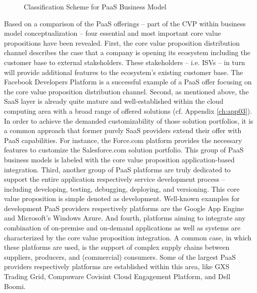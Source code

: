 \begin{figure}[tb]
	\centering
	
	\caption{Classification Scheme for PaaS Business Model}
	\label{fig:cs}
\end{figure}

Based on a comparison of the \ac{PaaS} offerings -- part of the \ac{CVP} within \citet{Johnson2008} business model conceptualization -- four essential and most important core value propositions have been revealed.  First, the core value proposition distribution channel describes the case that a company is opening its ecosystem including the customer base to external stakeholders. These stakeholders -- i.e. \acp{ISV} -- in turn will provide additional features to the ecosystem's existing customer base. The Facebook Developers Platform is a successful example of a \ac{PaaS} offer focusing on the core value proposition distribution channel. Second, as mentioned above, the \ac{SaaS} layer is already quite mature and well-established within the cloud computing area with a broad range of offered solutions (cf. Appendix \ref{ch:app03}). In order to achieve the demanded customizability of those solution portfolios, it is a common approach that former purely \ac{SaaS} providers extend their offer with \ac{PaaS} capabilities. For instance, the Force.com platform provides the necessary features to customize the Salesforce.com solution portfolio. This group of \ac{PaaS} business models is labeled with the core value proposition application-based integration. Third, another group of \ac{PaaS} platforms are truly dedicated to support the entire application respectively service development process -- including developing, testing, debugging, deploying, and versioning. This core value proposition is simple denoted as development. Well-known examples for development \ac{PaaS} providers respectively platforms are the Google App Engine and Microsoft's Windows Azure. And fourth, platforms aiming to integrate any combination of on-premise and on-demand applications as well as systems are characterized by the core value proposition integration. A common case, in which these platforms are used, is the support of complex supply chains between suppliers, producers, and (commercial) consumers. Some of the largest \ac{PaaS} providers respectively platforms are established within this area, like GXS Trading Grid, Compuware Covisint Cloud Engagement Platform, and Dell Boomi.

